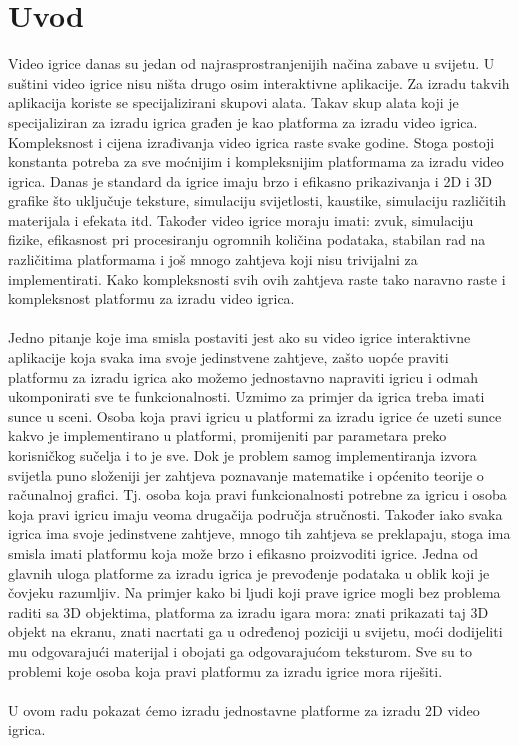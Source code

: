 \documentclass{mathos}
\begin{document}
\tableofcontents

\chapter{Uvod}\label{Uvod}
\noindent
Video igrice danas su jedan od najrasprostranjenijih načina zabave u svijetu. U suštini video igrice nisu ništa drugo osim interaktivne aplikacije. Za izradu takvih aplikacija
koriste se specijalizirani skupovi alata. Takav skup alata koji je specijaliziran za izradu igrica građen je kao platforma za izradu video igrica. Kompleksnost i cijena
izrađivanja video igrica raste svake godine. Stoga postoji konstanta potreba za sve moćnijim i kompleksnijim platformama za izradu video igrica. Danas je standard da igrice
imaju brzo i efikasno prikazivanja i 2D i 3D grafike što uključuje teksture, simulaciju svijetlosti, kaustike, simulaciju različitih materijala i efekata itd. Također video
igrice moraju imati: zvuk, simulaciju fizike, efikasnost pri procesiranju ogromnih količina podataka, stabilan rad na različitima platformama i još mnogo zahtjeva koji nisu
trivijalni za implementirati. Kako kompleksnosti svih ovih zahtjeva raste tako naravno raste i kompleksnost platformu za izradu video igrica.
\\ \\
Jedno pitanje koje ima smisla postaviti jest ako su video igrice interaktivne aplikacije koja svaka ima svoje jedinstvene zahtjeve, zašto uopće praviti platformu za izradu
igrica ako možemo jednostavno napraviti igricu i odmah ukomponirati sve te funkcionalnosti. Uzmimo za primjer da igrica treba imati sunce u sceni. Osoba koja pravi igricu u
platformi za izradu igrice će uzeti sunce kakvo je implementirano u platformi, promijeniti par parametara preko korisničkog sučelja i to je sve. Dok je problem samog
implementiranja izvora svijetla puno složeniji jer zahtjeva poznavanje matematike i općenito teorije o računalnoj grafici. Tj. osoba koja pravi funkcionalnosti potrebne za igricu
i osoba koja pravi igricu imaju veoma drugačija područja stručnosti. Također iako svaka igrica ima svoje jedinstvene zahtjeve, mnogo tih zahtjeva se preklapaju, stoga ima smisla
imati platformu koja može brzo i efikasno proizvoditi igrice. Jedna od glavnih uloga platforme za izradu igrica je prevođenje podataka u oblik koji je čovjeku razumljiv. Na
primjer kako bi ljudi koji prave igrice mogli bez problema raditi sa 3D objektima, platforma za izradu igara mora: znati prikazati taj 3D objekt na ekranu, znati nacrtati ga u
određenoj poziciji u svijetu, moći dodijeliti mu odgovarajući materijal i obojati ga odgovarajućom teksturom. Sve su to problemi koje osoba koja pravi platformu za izradu igrice
mora riješiti.
\\ \\
U ovom radu pokazat ćemo izradu jednostavne platforme za izradu 2D video igrica.
\end{document}
